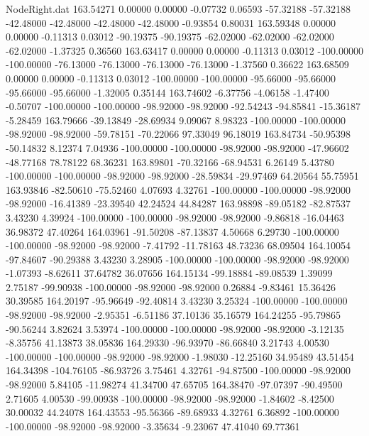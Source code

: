 \begin{filecontents}{NodeRight.dat}
 163.54271    0.00000    0.00000    -0.07732    0.06593  -57.32188  -57.32188  -42.48000  -42.48000  -42.48000  -42.48000   -0.93854    0.80031
 163.59348    0.00000    0.00000    -0.11313    0.03012  -90.19375  -90.19375  -62.02000  -62.02000  -62.02000  -62.02000   -1.37325    0.36560
 163.63417    0.00000    0.00000    -0.11313    0.03012 -100.00000 -100.00000  -76.13000  -76.13000  -76.13000  -76.13000   -1.37560    0.36622
 163.68509    0.00000    0.00000    -0.11313    0.03012 -100.00000 -100.00000  -95.66000  -95.66000  -95.66000  -95.66000   -1.32005    0.35144
 163.74602   -6.37756   -4.06158    -1.47400   -0.50707 -100.00000 -100.00000  -98.92000  -98.92000  -92.54243  -94.85841  -15.36187   -5.28459
 163.79666  -39.13849  -28.69934     9.09067    8.98323 -100.00000 -100.00000  -98.92000  -98.92000  -59.78151  -70.22066   97.33049   96.18019
 163.84734  -50.95398  -50.14832     8.12374    7.04936 -100.00000 -100.00000  -98.92000  -98.92000  -47.96602  -48.77168   78.78122   68.36231
 163.89801  -70.32166  -68.94531     6.26149    5.43780 -100.00000 -100.00000  -98.92000  -98.92000  -28.59834  -29.97469   64.20564   55.75951
 163.93846  -82.50610  -75.52460     4.07693    4.32761 -100.00000 -100.00000  -98.92000  -98.92000  -16.41389  -23.39540   42.24524   44.84287
 163.98898  -89.05182  -82.87537     3.43230    4.39924 -100.00000 -100.00000  -98.92000  -98.92000   -9.86818  -16.04463   36.98372   47.40264
 164.03961  -91.50208  -87.13837     4.50668    6.29730 -100.00000 -100.00000  -98.92000  -98.92000   -7.41792  -11.78163   48.73236   68.09504
 164.10054  -97.84607  -90.29388     3.43230    3.28905 -100.00000 -100.00000  -98.92000  -98.92000   -1.07393   -8.62611   37.64782   36.07656
 164.15134  -99.18884  -89.08539     1.39099    2.75187  -99.90938 -100.00000  -98.92000  -98.92000    0.26884   -9.83461   15.36426   30.39585
 164.20197  -95.96649  -92.40814     3.43230    3.25324 -100.00000 -100.00000  -98.92000  -98.92000   -2.95351   -6.51186   37.10136   35.16579
 164.24255  -95.79865  -90.56244     3.82624    3.53974 -100.00000 -100.00000  -98.92000  -98.92000   -3.12135   -8.35756   41.13873   38.05836
 164.29330  -96.93970  -86.66840     3.21743    4.00530 -100.00000 -100.00000  -98.92000  -98.92000   -1.98030  -12.25160   34.95489   43.51454
 164.34398 -104.76105  -86.93726     3.75461    4.32761  -94.87500 -100.00000  -98.92000  -98.92000    5.84105  -11.98274   41.34700   47.65705
 164.38470  -97.07397  -90.49500     2.71605    4.00530  -99.00938 -100.00000  -98.92000  -98.92000   -1.84602   -8.42500   30.00032   44.24078
 164.43553  -95.56366  -89.68933     4.32761    6.36892 -100.00000 -100.00000  -98.92000  -98.92000   -3.35634   -9.23067   47.41040   69.77361

\end{filecontents}
